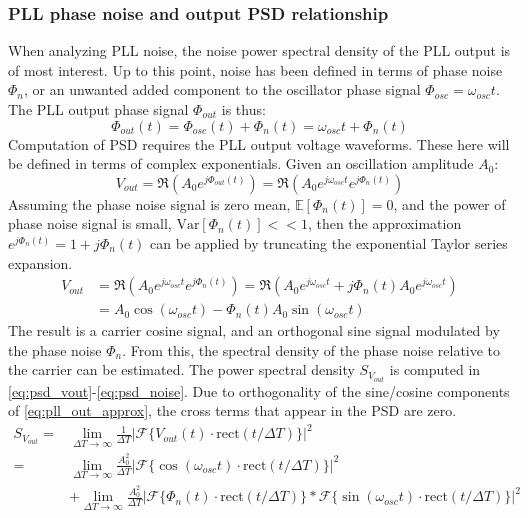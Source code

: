 \subsubsection{PLL phase noise and output PSD relationship}\label{pn_noise_psd}
	When analyzing PLL noise, the noise power spectral density of the PLL output is of most interest. Up to this point, noise has been defined in terms of phase noise $\Phi_{n}$, or an unwanted added component to the oscillator phase signal $\Phi_{osc}=\omega_{osc}t$. The PLL output phase signal $\Phi_{out}$ is thus:
	\begin{equation}
		\Phi_{out}(t) = \Phi_{osc}(t) + \Phi_{n}(t) = \omega_{osc}t + \Phi_{n}(t) 
	\end{equation}
	Computation of PSD requires the PLL output voltage waveforms. These here will be defined in terms of complex exponentials. Given an oscillation amplitude $A_0$:
	\begin{equation}
		V_{out} = \Re\left(A_0e^{j\Phi_{out}(t)}\right) = \Re\left(A_0e^{j\omega_{osc}t}e^{j\Phi_{n}(t)}\right)
	\end{equation}
	Assuming the phase noise signal is zero mean, $\mathbb{E}[\Phi_{n}(t)]=0$, and the power of phase noise signal is small, $\mathrm{Var}[\Phi_{n}(t)] << 1$, then the approximation $e^{j\Phi_{n}(t)} = 1 + j\Phi_{n}(t)$ can be applied by truncating the exponential Taylor series expansion.
	\begin{align}
		V_{out} &= \Re\left(A_0e^{j\omega_{osc}t}e^{j\Phi_{n}(t)}\right) = \Re\left(A_0e^{j\omega_{osc}t} +j\Phi_{n}(t)A_0e^{j\omega_{osc}t}\right)\\
		&= A_0\cos(\omega_{osc}t) - \Phi_{n}(t)A_0\sin(\omega_{osc}t) \label{eq:pll_out_approx}
	\end{align}
	The result is a carrier cosine signal, and an orthogonal sine signal modulated by the phase noise $\Phi_{n}$. From this, the spectral density of the phase noise relative to the carrier can be estimated. The power spectral density $S_{V_{out}}$ is computed in \ref{eq:psd_vout}-\ref{eq:psd_noise}. Due to orthogonality of the sine/cosine components of \ref{eq:pll_out_approx}, the cross terms that appear in the PSD are zero. 
	\begin{align}
		S_{V_{out}} =& \lim_{\Delta T\rightarrow\infty}\frac{1}{\Delta T}|\mathcal{F}\{V_{out}(t)\cdot\mathrm{rect}(t/\Delta T)\}|^2 \label{eq:psd_vout}\\
		=&\lim_{\Delta T\rightarrow\infty}\frac{A_0^2}{\Delta T}|\mathcal{F}\{\cos(\omega_{osc}t)\cdot\mathrm{rect}(t/\Delta T)\}|^2 \label{eq:psd_carrier}\\ 
		&+ \lim_{\Delta T\rightarrow\infty}\frac{A_0^2}{\Delta T}|\mathcal{F}\{\Phi_{n}(t)\cdot\mathrm{rect}(t/\Delta T)\}*\mathcal{F}\{\sin(\omega_{osc}t)\cdot\mathrm{rect}(t/\Delta T)\}|^2 \label{eq:psd_noise}
	\end{align}
